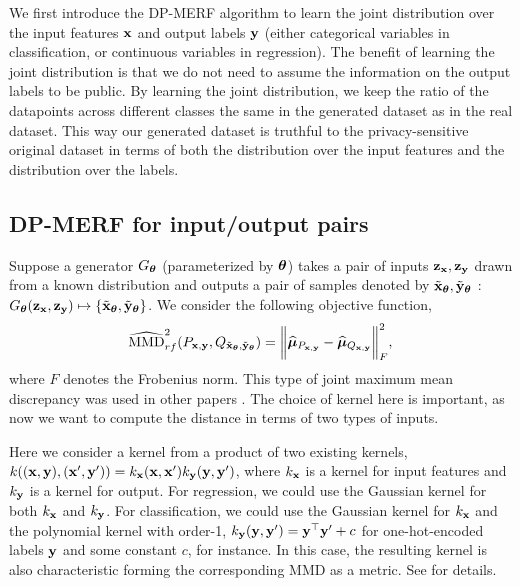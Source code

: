\documentclass{article}
\newcommand{\mpsay}[1]{[\textbf{MP:} \textcolor{red!60!black}{#1}]}
\begin{document}
We first introduce the DP-MERF algorithm to learn the joint distribution over the input features $\mathbf{x}$ and output labels $\mathbf{y}$ (either categorical variables in classification, or continuous variables  in regression). 
%
The benefit of learning the joint distribution is that we do not need to assume the information on the output labels to be public. By learning the joint distribution, we keep the ratio of the datapoints across different classes the same in the generated dataset as in the real dataset. This way our generated dataset is truthful to the privacy-sensitive original dataset in terms of both the distribution over the input features and the distribution over the labels.   



\subsection{DP-MERF for input/output pairs}

Suppose a generator $G_{\mathbf{\bm{\theta}}}$ (parameterized by $\mathbf{\bm{\theta}}$) takes a pair of inputs $\mathbf{z}_{\mathbf{x}}, \mathbf{z}_{\mathbf{y}}$ drawn from a known distribution and outputs a pair of samples denoted by $\tilde{\mathbf{x}}_{\mathbf{\bm{\theta}}},\tilde{\mathbf{y}}_{\mathbf{\bm{\theta}}}$ : $G_{\mathbf{\bm{\theta}}}(\mathbf{z}_{\mathbf{x}}, \mathbf{z}_{\mathbf{y}}) \mapsto \{\tilde{\mathbf{x}}_{\mathbf{\bm{\theta}}},\tilde{\mathbf{y}}_{\mathbf{\bm{\theta}}}\}$.
We consider the following objective function, 
%
\begin{align}\label{eq:MMD_rf_joint}
\widehat{\mathrm{MMD}}_{rf}^{2}(P_{\mathbf{x}, \mathbf{y}}, Q_{\tilde{\mathbf{x}}_{\mathbf{\bm{\theta}}}, \tilde{\mathbf{y}}_{\mathbf{\bm{\theta}}}}) = \bigg\|\widehat{\mathbf{\bm{\mu}}}_{P_{\mathbf{x}, \mathbf{y}}}-\widehat{\mathbf{\bm{\mu}}}_{Q_{\mathbf{x}, \mathbf{y}}}\bigg\|_{F}^{2},
\end{align}
where $F$ denotes the Frobenius norm.  This type of joint maximum mean discrepancy was used in other papers \cite{Zhang2019, ijcai2018-293}.  
The choice of kernel here is important, as now we want to compute the distance in terms of two types of inputs. 

Here we consider a kernel from a product of two existing kernels, $k((\mathbf{x},\mathbf{y}), (\mathbf{x}', \mathbf{y}')) = k_{\mathbf{x}}(\mathbf{x}, \mathbf{x}') k_{\mathbf{y}} (\mathbf{y}, \mathbf{y}')$, where $k_{\mathbf{x}}$ is a kernel for input features and $k_{\mathbf{y}}$ is a kernel for output. For regression, we could use the Gaussian kernel for both $k_{\mathbf{x}}$ and $k_{\mathbf{y}}$.  For classification, we could use the Gaussian kernel for $k_{\mathbf{x}}$ and the polynomial kernel with order-1, $k_{\mathbf{y}}(\mathbf{y}, \mathbf{y}') = \mathbf{y}{^\top}\mathbf{y}'+c$ for one-hot-encoded labels $\mathbf{y}$ and some constant $c$, for instance. 
In this case, the resulting kernel is also characteristic forming the corresponding MMD as a metric. See \citep{JMLR:v18:17-492} for details. 
\end{document}
